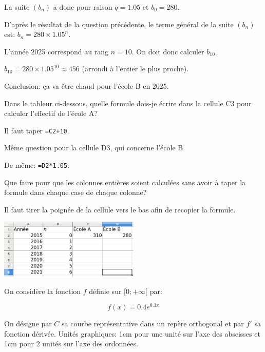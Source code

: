 \documentclass[a4paper,12pt]{scrartcl}
\begin{document}
La suite $\left( b_n \right)$ a donc pour raison $q = 1.05$ et $b_0 = 280$.


D'après le résultat de la question précédente, le terme général de la suite $\left( b_n \right)$ est: $b_n = 280 \times 1.05^n$. 

L'année 2025 correspond au rang $n = 10$. On doit donc calculer $b_{10}$. 

$b_{10} = 280 \times 1.05^{10} \approx 456$ (arrondi à l'entier le plus proche). 

Conclusion: ça va être chaud pour l'école B en 2025.

\question{}
Dans le tableur ci-dessous, quelle formule dois-je écrire dans la cellule C3 pour calculer l'effectif de l'école A? 

Il faut taper \texttt{=C2+10}.

Même question pour la cellule D3, qui concerne l'école B.

De même: \texttt{=D2*1.05}.

Que faire pour que les colonnes entières soient calculées sans avoir à taper la formule dans chaque case de chaque colonne?

Il faut tirer la poignée de la cellule vers le bas afin de recopier la formule.

\begin{center}
\includegraphics[width=0.5\textwidth]{pics/1.png}
\end{center}


On considère la fonction $f$ définie sur $[0;+\infty[$ par:

$$f(x) = 0.4 e^{0.3x}$$

On désigne par $C$ sa courbe représentative dans un repère orthogonal et par $f'$ sa fonction dérivée. Unités graphiques: 1cm pour une unité sur l'axe des abscisses et 1cm pour 2 unités sur l'axe des ordonnées.

\end{document}

